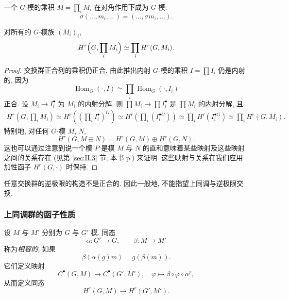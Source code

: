 一个 $G$-模的乘积 $M=\prod_i M_i$ 在对角作用下成为 $G$-模:
\[
 \sigma(\ldots,m_i,\ldots)=(\ldots,\sigma m_i,\ldots).
\]

\begin{proposition}\label{prop:ii.1.25}
对所有的 $G$-模族 $(M_i)_i$,
\[
 H^r\Bigl(G,\prod_i M_i\Bigr)\simeq \prod_i H^r(G,M_i).
\]
\end{proposition}

\begin{proof}
交换群正合列的乘积仍正合. 由此推出内射 $G$-模的乘积 $I=\prod I_i$ 仍是内射的, 因为
\[
 \operatorname{Hom}_G(\cdot,I)\simeq \prod_i \operatorname{Hom}_G(\cdot,I_i)
\]
正合. 设 $M_i\to I_i^\bullet$ 为 $M_i$ 的内射分解. 则 $\prod M_i\to\prod I_i^\bullet$ 是 $\prod M_i$ 的内射分解, 且
\[
 \begin{array}{r}
 H^r(G,\prod_i M_i)\simeq H^r((\prod_i I_i^{\bullet})^G)\simeq H^r(\prod_i (I_i^{\bullet G}))\simeq \prod_i H^r(I_i^{\bullet G})\simeq \prod_i H^r(G,M_i).
 \end{array}
\]
特别地, 对任何 $G$-模 $M$, $N$,
\[
 H^r(G,M\oplus N)=H^r(G,M)\oplus H^r(G,N).
\]
这也可以通过注意到说一个模 $P$ 是模 $M$ 与 $N$ 的直和意味着某些映射及这些映射之间的关系存在 (见第 \ref{sec:II.3} 节, 本书 p.\pageref{sec:II.3}) 来证明. 这些映射与关系在我们应用加性函子 $H^r(G,\cdot)$ 时保持.
\end{proof}

\begin{remark}\label{rem:ii.1.26}
任意交换群的逆极限的构造不是正合的. 因此一般地, 不能指望上同调与逆极限交换.
\end{remark}

\subsubsection*{上同调群的函子性质}

设 $M$ 与 $M'$ 分别为 $G$ 与 $G'$ 模. 同态
\[
 \alpha\colon G'\to G,\qquad \beta\colon M\to M'
\]
称为\emph{相容的}, 如果
\[
 \beta(\alpha(g)m)=g(\beta(m)).
\]
它们定义映射
\[
 C^\bullet(G,M)\to C^\bullet(G',M'),\quad \varphi\mapsto \beta\circ\varphi\circ\alpha^r,
\]
从而定义同态
\[
 H^r(G,M)\to H^r(G',M').
\]

